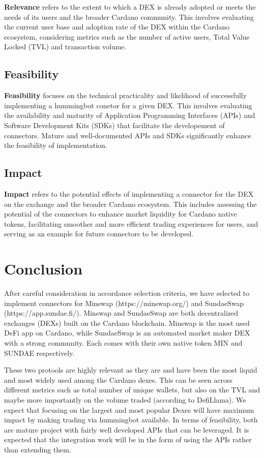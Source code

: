 \documentclass{scrreport}
\begin{document}
  \textbf{Relevance} refers to the extent to which a DEX is already adopted or 
  meets the needs of its users and the broader Cardano community. This involves evaluating the current user
  base and adoption rate of the DEX within the Cardano ecosystem, considering metrics such 
  as the number of active users, Total Value Locked (TVL) and transaction volume.
  
  \subsection{Feasibility}
  
  \textbf{Feasibility} focuses on the technical practicality and likelihood of 
  successfully implementing a hummingbot conetor for a given DEX. This involves evaluating the availability and 
  maturity of Application Programming Interfaces (APIs) and Software 
  Development Kits (SDKs) that facilitate the developement of connectors. 
  Mature and well-documented APIs and SDKs significantly enhance the 
  feasibility of implementation. 
  
  \subsection{Impact}
  
  \textbf{Impact} refers to the potential effects of implementing a connector
  for the DEX on the exchange and the broader Cardano ecosystem. 
  This includes assessing the potential of the connectors 
  to enhance market liquidity for Cardano native tokens, facilitating 
  smoother and more efficient trading experiences for users, and serving as an example for future connectors to be developed.


  \section{Conclusion}
  
  After careful consideration in accordance selection criteria, we have selected to implement connectors 
  for Minswap (https://minswap.org/) and SundaeSwap (https://app.sundae.fi/). Minswap and SundaeSwap are both 
  decentralized exchanges (DEXs) built on the Cardano blockchain. Minswap is the most used DeFi app on Cardano, 
  while SundaeSwap is an automated market maker DEX with a strong community. Each comes with their own native 
  token MIN and SUNDAE respectively.

  These two protools are highly relevant as they are and have been the most liquid and most widely used among 
  the Cardano dexes. This can be seen across different metrics such as total number of unique wallets, but also 
  on the TVL and maybe more importantly on the volume traded (according to DefiLlama). We expect that focusing 
  on the largest and most popular Dexes will have maximum impact by making trading via hummingbot available. 
  In terms of feasibility, both are mature project with fairly well developed APIs that can be leveraged. 
  It is expected that the integration work will be in the form of using the APIs rather than extending them.
  
\end{document}
